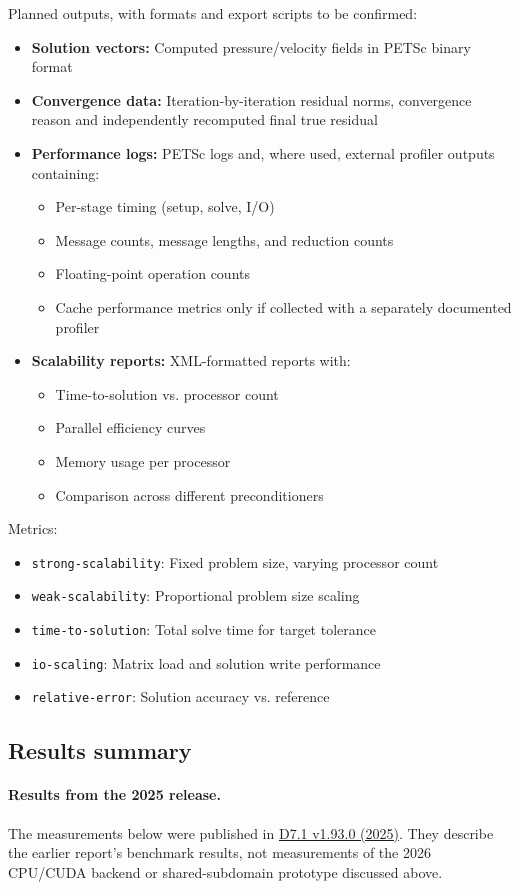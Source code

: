 Planned outputs, with formats and export scripts to be confirmed:
\begin{itemize}
\item \textbf{Solution vectors:} Computed pressure/velocity fields in PETSc binary format

\item \textbf{Convergence data:} Iteration-by-iteration residual norms, convergence reason and independently recomputed final true residual

\item \textbf{Performance logs:} PETSc logs and, where used, external profiler outputs containing:
  \begin{itemize}
  \item Per-stage timing (setup, solve, I/O)
  \item Message counts, message lengths, and reduction counts
  \item Floating-point operation counts
  \item Cache performance metrics only if collected with a separately documented profiler
  \end{itemize}

\item \textbf{Scalability reports:} XML-formatted reports with:
  \begin{itemize}
  \item Time-to-solution vs. processor count
  \item Parallel efficiency curves
  \item Memory usage per processor
  \item Comparison across different preconditioners
  \end{itemize}
\end{itemize}

Metrics:
\begin{itemize}
    \item \texttt{strong-scalability}: Fixed problem size, varying processor count
    \item \texttt{weak-scalability}: Proportional problem size scaling
    \item \texttt{time-to-solution}: Total solve time for target tolerance
    \item \texttt{io-scaling}: Matrix load and solution write performance
    \item \texttt{relative-error}: Solution accuracy vs. reference
\end{itemize}



\subsection{Results summary}
\paragraph{Results from the 2025 release.}
The measurements below were published in
\href{https://github.com/numpex/exa-ma-d7.1/blob/v1.93.0/chapters/applications/specs/app-hpddm-dfn.tex}{D7.1 v1.93.0 (2025)}.
They describe the earlier report's benchmark results, not measurements of
the 2026 CPU/CUDA backend or shared-subdomain prototype discussed above.
